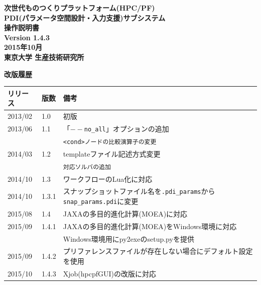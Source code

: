 \documentclass[a4paper,11pt]{jarticle}
\begin{document}
\begin{titlepage}
\vspace*{5cm}
\begin{center}%
{\LARGE \bf 次世代ものつくりプラットフォーム(HPC/PF)\\

PDI(パラメータ空間設計・入力支援)サブシステム\\

操作説明書\\}
\vspace*{2.5cm}
\bf Version 1.4.3\\
\vspace*{1cm}
\bf 2015年10月\\
\vspace*{3.5cm}
{\large\bf 東京大学 生産技術研究所\\}

\end{center}
\end{titlepage}


\newpage

{\Large\bf 改版履歴}

\vspace{12pt}
\begin{tabular}{|l|l|l|} \hline
リリース & 版数 & 備考\hspace*{11cm}\\ \hline
2013/02 & 1.0 & 初版\\ \hline
2013/06 & 1.1 & 「{\tt $--$no\_all}」オプションの追加\\
 & & {\tt <cond>ノードの比較演算子の変更}\\ \hline
2014/03 & 1.2 & templateファイル記述方式変更\\
 & & {\tt 対応ソルバの追加}\\ \hline
2014/10 & 1.3 & ワークフローのLua化に対応\\ \hline
2014/10 & 1.3.1 & スナップショットファイル名を{\tt .pdi\_params}から{\tt snap\_params.pdi}に変更\\ \hline
2015/08 & 1.4 & JAXAの多目的進化計算(MOEA)に対応\\ \hline
2015/09 & 1.4.1 & JAXAの多目的進化計算(MOEA)をWindows環境に対応\\
 & & Windows環境用にpy2exeのsetup.pyを提供\\ \hline
2015/09 & 1.4.2 & プリファレンスファイルが存在しない場合にデフォルト設定を使用\\ \hline
2015/10 & 1.4.3 & Xjob(hpcpfGUI)の改版に対応\\ \hline
\end{tabular}
\end{document}
